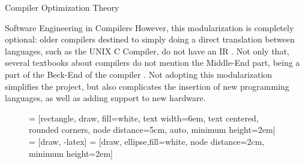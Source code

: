 \begin{section}{Compiler Optimization Theory}
\begin{section}{Software Engineering in Compilers}
However, this modularization is completely optional: older compilers destined
to simply doing a direct translation between languages, such as the UNIX C
Compiler, do not have an IR \citep{ritchie1979tour}. Not only that, several
textbooks about compilers do not mention the Middle-End part, being a part of
the Beck-End of the compiler \citep{dragonbook}. Not adopting this
modularization simplifies the project, but also complicates the insertion of
new programming languages, as well as adding support to new hardware.



\begin{figure}
 = [rectangle, draw, fill=white,
    text width=6em, text centered, rounded corners, node distance=5cm, auto, minimum height=2em]
 = [draw, -latex]
 = [draw, ellipse,fill=white, node distance=2cm,
    minimum height=2em]

\begin{center}
\end{center}
\end{figure}
\end{section}
\end{section}
